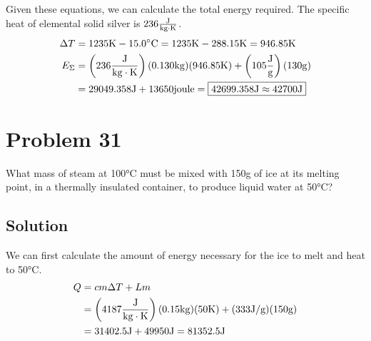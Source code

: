 \documentclass[12pt]{article}
\begin{document}
        Given these equations, we can calculate the total energy required.
        The specific heat of elemental solid silver is $236 \unit{\frac{\joule}{\kilo\gram\cdot\kelvin}}$.
        \begin{align}
            \Delta T    &=  1235 \unit{\kelvin} - 15.0 \unit{\celsius}
                =   1235 \unit{\kelvin} - 288.15 \unit{\kelvin}
                =   946.85 \unit{\kelvin}\\
            E_\Sigma    &=  \left( 236 \unit{\frac{\joule}{\kilo\gram\cdot\kelvin}} \right) (0.130 \unit{\kilo\gram}) (946.85 \unit{\kelvin}) + \left( 105 \unit{\frac{\joule}{\gram}} \right) \left( 130 \unit{\gram} \right)\\
                &=  29049.358 \unit{\joule} + 13650 \unit{joule}
                =   \boxed{42699.358 \unit{\joule} \approx 42700 \unit{\joule}}
        \end{align}

    \pagebreak
    \section{Problem 31}
        What mass of steam at 100\unit{\celsius} must be mixed with 150\unit{\gram} of ice at its melting point, in a thermally insulated container, to produce liquid water at 50\unit{\celsius}?

        \subsection{Solution}
        We can first calculate the amount of energy necessary for the ice to melt and heat to 50\unit{\celsius}. 
        \begin{align}
            Q   &=  cm \Delta T + Lm\\
                &=  \left( 4187 \unit{\frac{\joule}{\kilo\gram\cdot\kelvin}} \right) (0.15 \unit{\kilo\gram}) (50 \unit{\kelvin}) + (333 \unit{\joule/\gram}) (150 \unit{\gram})\\
                &=  31402.5 \unit{\joule} + 49950 \unit{\joule}
                =   81352.5 \unit{\joule}
        \end{align}
\end{document}
